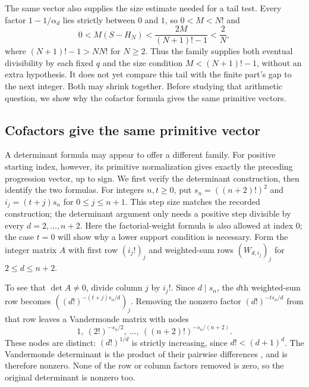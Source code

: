 The same vector also supplies the size estimate needed for a tail test.
Every factor $1-1/\alpha_d$ lies strictly between $0$ and $1$, so
$0<M<N!$ and
\[
 0<M(S-H_N)<\frac{2M}{(N+1)!-1}<\frac2N,
\]
where $(N+1)!-1>NN!$ for $N\ge2$. Thus the family supplies both
eventual divisibility by each fixed $q$ and the size condition
$M<(N+1)!-1$, without an extra hypothesis. It does not yet compare
this tail with the finite part's gap to the next integer. Both may
shrink together. Before studying that arithmetic question, we show why
the cofactor formula gives the same primitive vectors.

\subsection{Cofactors give the same primitive vector}\label{long68:sec:cofactor-progression}
A determinant formula may appear to offer a different family. For
positive starting index, however, its primitive normalization gives
exactly the preceding progression vector, up to sign. We first verify
the determinant construction, then identify the two formulas. For
integers $n,t\ge0$, put
$s_n=((n+2)!)^2$ and $i_j=(t+j)s_n$ for $0\le j\le n+1$.
This step size matches the recorded construction; the determinant argument
only needs a positive step divisible by every $d=2,\ldots,n+2$.
Here the factorial-weight formula is also allowed at index $0$; the case
$t=0$ will show why a lower support condition is necessary. Form the
integer matrix $A$ with first row $(i_j!)_j$ and weighted-sum rows
$(W_{d,i_j})_j$ for $2\le d\le n+2$.

To see that $\det A\ne0$, divide column $j$ by $i_j!$.
Since $d\mid s_n$, the $d$th weighted-sum row becomes
$((d!)^{-(t+j)s_n/d})_j$. Removing the nonzero factor
$(d!)^{-t s_n/d}$ from that row leaves a Vandermonde matrix with nodes
\[
1,\ (2!)^{-s_n/2},\ \ldots,\ ((n+2)!)^{-s_n/(n+2)}.
\]
These nodes are distinct: $(d!)^{1/d}$ is strictly increasing, since
$d!<(d+1)^d$. The Vandermonde determinant is the product of their
pairwise differences \cite[(1.3.13)]{nist-vandermonde}, and is therefore nonzero. None of the row or
column factors removed is zero, so the original determinant is nonzero
too.

